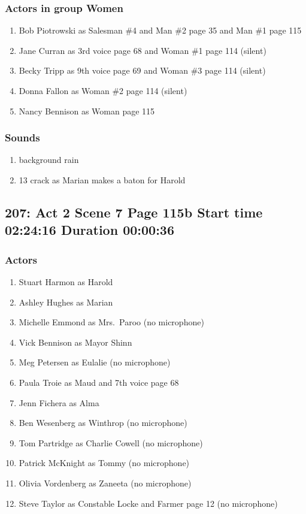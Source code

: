 \subsubsection{Actors in group Women}
\begin{enumerate}
\item Bob Piotrowski as Salesman \#4 and Man \#2 page 35 and Man \#1 page 115
\item Jane Curran as 3rd voice page 68 and Woman \#1 page 114 (silent)
\item Becky Tripp as 9th voice page 69 and Woman \#3 page 114 (silent)
\item Donna Fallon as Woman \#2 page 114 (silent)
\item Nancy Bennison as Woman page 115
\end{enumerate}

\subsubsection{Sounds}
\begin{enumerate}
\item background rain
\item 13 crack as Marian makes a baton for Harold
\end{enumerate}
\subsection{207: Act 2 Scene 7 Page 115b Start time 02:24:16 Duration 00:00:36}

\subsubsection{Actors}
\begin{enumerate}
\item Stuart Harmon as Harold
\item Ashley Hughes as Marian
\item Michelle Emmond as Mrs.~Paroo (no microphone)
\item Vick Bennison as Mayor Shinn
\item Meg Petersen as Eulalie (no microphone)
\item Paula Troie as Maud and 7th voice page 68
\item Jenn Fichera as Alma
\item Ben Wesenberg as Winthrop (no microphone)
\item Tom Partridge as Charlie Cowell (no microphone)
\item Patrick McKnight as Tommy (no microphone)
\item Olivia Vordenberg as Zaneeta (no microphone)
\item Steve Taylor as Constable Locke and Farmer page 12 (no microphone)
\end{enumerate}

